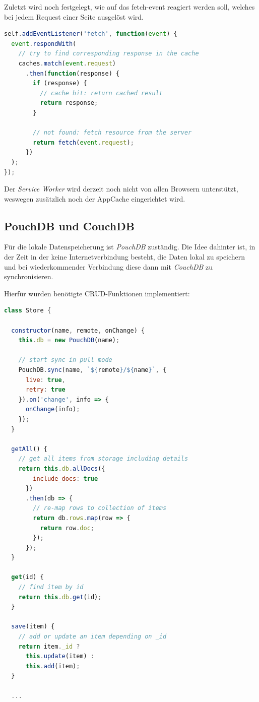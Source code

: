 Zuletzt wird noch festgelegt, wie auf das fetch-event\cite{fetch} reagiert werden soll, welches bei jedem Request einer Seite ausgelöst wird. 

\begin{lstlisting}[language=JavaScript]
self.addEventListener('fetch', function(event) {
  event.respondWith(
    // try to find corresponding response in the cache
    caches.match(event.request)
      .then(function(response) {
        if (response) {
          // cache hit: return cached result
          return response;
        }

        // not found: fetch resource from the server
        return fetch(event.request);
      })
  );
});
\end{lstlisting}

Der \textit{Service Worker} wird derzeit noch nicht von allen Browsern unterstützt\cite{sworkerusage}, weswegen zusätzlich noch der AppCache\cite{appcache} eingerichtet wird. 

\subsection{PouchDB und CouchDB}

Für die lokale Datenspeicherung ist \textit{PouchDB} zuständig. Die Idee dahinter ist, in der Zeit in der keine Internetverbindung besteht, die Daten lokal zu speichern und bei wiederkommender Verbindung diese dann mit \textit{CouchDB} zu synchronisieren. 

Hierfür wurden benötigte CRUD-Funktionen implementiert:
\begin{lstlisting}[language=JavaScript]
class Store {

  constructor(name, remote, onChange) {
    this.db = new PouchDB(name);

    // start sync in pull mode
    PouchDB.sync(name, `${remote}/${name}`, {
      live: true,
      retry: true
    }).on('change', info => {
      onChange(info);
    });
  }

  getAll() {
    // get all items from storage including details
    return this.db.allDocs({
        include_docs: true
      })
      .then(db => {
        // re-map rows to collection of items
        return db.rows.map(row => {
          return row.doc;
        });
      });
  }

  get(id) {
    // find item by id
    return this.db.get(id);
  }

  save(item) {
    // add or update an item depending on _id
    return item._id ?
      this.update(item) :
      this.add(item);
  }

  ...
\end{lstlisting}

